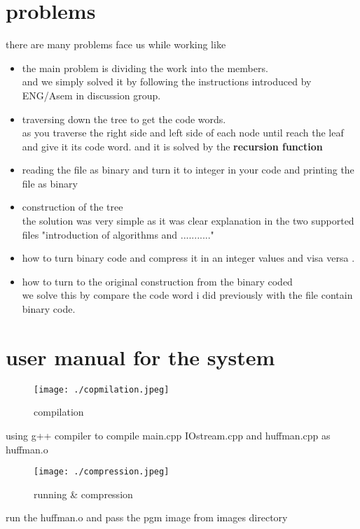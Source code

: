 \documentclass[14 pt,a4paper,double column]{article}
\begin{document}
\section{problems}
there are many problems face us while working like 
\begin{itemize}
\item the main problem is dividing the work into the members.\\
and we simply solved it by following the instructions introduced by ENG/Asem in discussion group.
\item traversing down the tree to get the code words.\\
as you traverse the right side and left side of each node until reach the leaf and give it its code word.
and it is solved by the \textbf{recursion function}
\item reading the file as binary and turn it to integer in your code and printing the file as binary
\item construction of the tree\\
the solution was very simple as it was clear explanation in the two supported files "introduction of algorithms and ..........."
\item how to turn binary code and compress it in an integer values and visa versa .
\item how to turn to the original construction from the binary coded \\
we solve this by compare the code word i did previously with the file contain binary code.
\end{itemize} 

\section{user manual for the system }
\begin{figure}[H] 
\texttt{[image: ./copmilation.jpeg]}
\caption{compilation}
\end{figure}
using g++ compiler to compile main.cpp IOstream.cpp and huffman.cpp as huffman.o 
\begin{figure}[H] 
\texttt{[image: ./compression.jpeg]}
\caption{running \& compression}
\end{figure}
run the huffman.o and pass the pgm image from images directory
\end{document}
